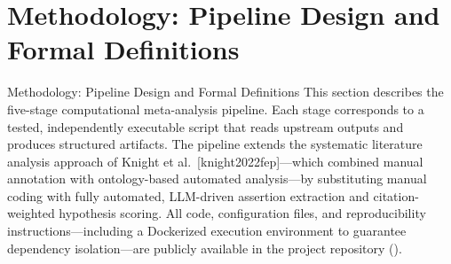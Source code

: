 \documentclass[
  ignorenonframetext,
]{beamer}
\author{\texorpdfstring{}{}}
\date{}
\providecommand{\citep}[1]{[#1]}
\begin{document}
\section{\texorpdfstring{Methodology: Pipeline Design and Formal
Definitions
\label{sec:methods}}{Methodology: Pipeline Design and Formal Definitions }}\label{methodology-pipeline-design-and-formal-definitions}

\begin{frame}{Methodology: Pipeline Design and
Formal Definitions \label{sec:methods}}
This section describes the five-stage computational meta-analysis
pipeline. Each stage corresponds to a tested, independently executable
script that reads upstream outputs and produces structured artifacts.
The pipeline extends the systematic literature analysis approach of
Knight et al.~\citep{knight2022fep}---which combined manual annotation
with ontology-based automated analysis---by substituting manual coding
with fully automated, LLM-driven assertion extraction and
citation-weighted hypothesis scoring. All code, configuration files, and
reproducibility instructions---including a Dockerized execution
environment to guarantee dependency isolation---are publicly available
in the project repository
().
\end{frame}
\end{document}
